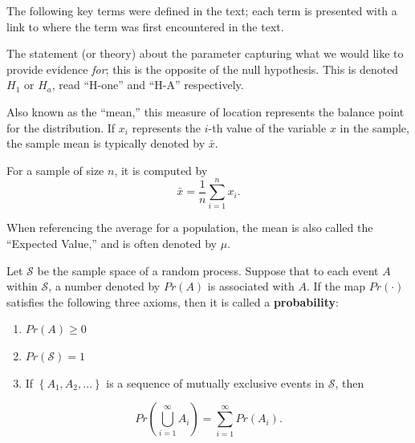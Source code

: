 \documentclass[
  letterpaper,
  DIV=11,
  numbers=noendperiod]{scrreprt}
\providecommand{\tightlist}{%
  \setlength{\itemsep}{0pt}\setlength{\parskip}{0pt}}\usepackage{longtable,booktabs,array}
\theoremstyle{definition}
\theoremstyle{plain}
\theoremstyle{definition}
\theoremstyle{remark}
\begin{document}
\providecommand{\Ell}{\mathcal{L}}
\providecommand{\indep}{\perp\negthickspace\negmedspace\perp}

The following key terms were defined in the text; each term is presented
with a link to where the term was first encountered in the text.

\begin{description}
\tightlist
\item[Alternative Hypothesis
(Definition~\ref{def-alternative-hypothesis})]
The statement (or theory) about the parameter capturing what we would
like to provide evidence \emph{for}; this is the opposite of the null
hypothesis. This is denoted \(H_1\) or \(H_a\), read ``H-one'' and
``H-A'' respectively.
\item[Average (Definition~\ref{def-average})]
Also known as the ``mean,'' this measure of location represents the
balance point for the distribution. If \(x_i\) represents the \(i\)-th
value of the variable \(x\) in the sample, the sample mean is typically
denoted by \(\bar{x}\).
\end{description}

For a sample of size \(n\), it is computed by
\[\bar{x} = \frac{1}{n}\sum_{i=1}^{n} x_i.\]

When referencing the average for a population, the mean is also called
the ``Expected Value,'' and is often denoted by \(\mu\).

\begin{description}
\tightlist
\item[Axioms of Probability (Definition~\ref{def-axioms})]
Let \(\mathcal{S}\) be the sample space of a random process. Suppose
that to each event \(A\) within \(\mathcal{S}\), a number denoted by
\(Pr(A)\) is associated with \(A\). If the map \(Pr(\cdot)\) satisfies
the following three axioms, then it is called a \textbf{probability}:
\end{description}

\begin{enumerate}
\def\labelenumi{\arabic{enumi}.}
\tightlist
\item
  \(Pr(A) \geq 0\)
\item
  \(Pr(\mathcal{S}) = 1\)
\item
  If \(\left\{A_1, A_2, \dotsc\right\}\) is a sequence of mutually
  exclusive events in \(\mathcal{S}\), then
\end{enumerate}

\[Pr\left(\bigcup_{i = 1}^{\infty} A_i\right) = \sum_{i = 1}^{\infty} Pr\left(A_i\right).\]
\end{document}
